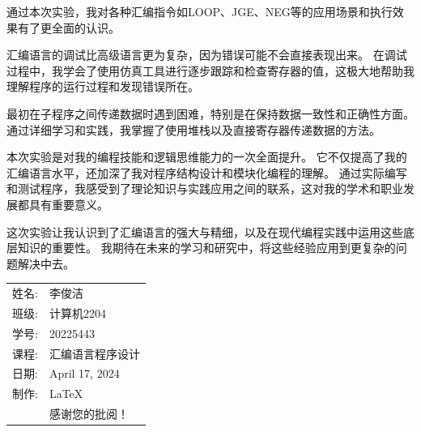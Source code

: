 \documentclass[12pt]{article}
\begin{document}
通过本次实验，我对各种汇编指令如LOOP、JGE、NEG等的应用场景和执行效果有了更全面的认识。

汇编语言的调试比高级语言更为复杂，因为错误可能不会直接表现出来。
在调试过程中，我学会了使用仿真工具进行逐步跟踪和检查寄存器的值，这极大地帮助我理解程序的运行过程和发现错误所在。

最初在子程序之间传递数据时遇到困难，特别是在保持数据一致性和正确性方面。
通过详细学习和实践，我掌握了使用堆栈以及直接寄存器传递数据的方法。

本次实验是对我的编程技能和逻辑思维能力的一次全面提升。
它不仅提高了我的汇编语言水平，还加深了我对程序结构设计和模块化编程的理解。
通过实际编写和测试程序，我感受到了理论知识与实践应用之间的联系，这对我的学术和职业发展都具有重要意义。

这次实验让我认识到了汇编语言的强大与精细，以及在现代编程实践中运用这些底层知识的重要性。
我期待在未来的学习和研究中，将这些经验应用到更复杂的问题解决中去。
\begin{flushright}\begin{tabular}{rl}
    姓名: & 李俊洁\\
    班级: & 计算机2204 \\
    学号: & 20225443 \\
    课程: & 汇编语言程序设计 \\
    日期: & April 17, 2024 \\
    制作: & \LaTeX \\
    & 感谢您的批阅！
\end{tabular}\end{flushright}
\end{document}
